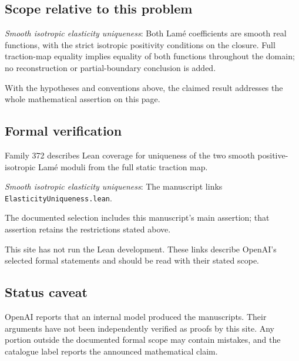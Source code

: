 \documentclass[11pt]{article}
\begin{document}
\subsection{Scope relative to this problem}
\textit{Smooth isotropic elasticity uniqueness}: Both Lamé coefficients are smooth real functions, with the strict isotropic positivity conditions on the closure. Full traction-map equality implies equality of both functions throughout the domain; no reconstruction or partial-boundary conclusion is added.

With the hypotheses and conventions above, the claimed result addresses the whole mathematical assertion on this page.

\subsection{Formal verification}
Family 372 describes Lean coverage for uniqueness of the two smooth positive-isotropic Lamé moduli from the full static traction map.

\textit{Smooth isotropic elasticity uniqueness}: The manuscript links \texttt{ElasticityUniqueness.lean}.

The documented selection includes this manuscript’s main assertion; that assertion retains the restrictions stated above.

This site has not run the Lean development. These links describe OpenAI’s selected formal statements and should be read with their stated scope.

\subsection{Status caveat}
OpenAI reports that an internal model produced the manuscripts. Their arguments have not been independently verified as proofs by this site. Any portion outside the documented formal scope may contain mistakes, and the catalogue label reports the announced mathematical claim.
\end{document}
